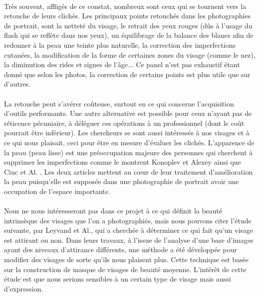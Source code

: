 \documentclass[11pt, french,screen]{report-rd-info}
\begin{document}
\paragraph*{}
Très souvent, affligés de ce constat, nombreux sont ceux qui se tournent vers la retouche de leurs clichés. Les principaux points retouchés dans les photographies de portrait, sont la netteté du visage, le retrait des yeux rouges (dûs à l'usage du flash qui se reflète dans nos yeux), un équilibrage de la balance des blancs afin de redonner à la peau une teinte plus naturelle, la correction des imperfections cutanées, la modification de la forme de certaines zones du visage (comme le nez), la diminution des rides et signes de l'âge... Ce panel n'est pas exhaustif étant donné que selon les photos, la correction de certains points est plus utile que sur d'autres.
\paragraph*{}
La retouche peut s'avérer coûteuse, surtout en ce qui concerne l'acquisition d'outils performants. Une autre alternative est possible pour ceux n'ayant pas de réticence pécuniaire, à déléguer ces opérations à un professionnel (dont le coût pourrait être inférieur). Les chercheurs se sont aussi intéressés à nos visages et à ce qui nous plaisait, ceci pour être en mesure d'évaluer les clichés. L’apparence de la peau (peau lisse) est une préoccupation majeure des personnes qui cherchent à supprimer les imperfections comme le montrent Konoplev et Alexey \cite{Konoplev2012} ainsi que Ciuc et Al. \cite{Ciuc2010}. Les deux articles mettent au cœur de leur traitement d'amélioration la peau puisqu'elle est supposée dans une photographie de portrait avoir une occupation de l'espace importante.
\paragraph*{}
Nous ne nous intéresseront pas dans ce projet à ce qui définit la beauté intrinsèque des visages que l'on a photographiés, mais nous pouvons citer l'étude suivante, par Leyvand et Al.\cite{Leyvand2008}, qui a cherchée à déterminer ce qui fait qu'un visage est attirant ou non. Dans leurs travaux, à l'issue de l'analyse d'une base d'images ayant des niveaux d'attirance différents,  une méthode a été développée pour modifier des visages de sorte qu'ils nous plaisent plus. Cette technique est basée sur la construction de masque de visages de beauté moyenne. L'intérêt de cette étude est que nous serions sensibles à un certain type de visage mais aussi d'expression.
\end{document}
